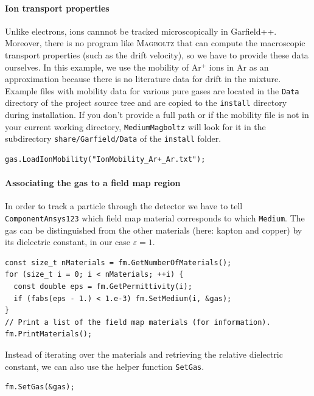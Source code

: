 \paragraph{Ion transport properties}
Unlike electrons, ions cannnot be tracked microscopically in Garfield++.
Moreover, there is no program like \textsc{Magboltz} that can compute  
the macroscopic transport properties (such as the drift velocity),
so we have to provide these data ourselves.
In this example, we use the mobility of Ar$^{+}$ ions in Ar
as an approximation because there is no literature data for drift in the
mixture.
Example files with mobility data for various pure gases are located
in the \texttt{Data} directory of the project source tree and are copied to the \texttt{install} directory during installation. 
If you don't provide a full path or if the mobility file is not in your current working directory, \texttt{MediumMagboltz} will look for it in the subdirectory \texttt{share/Garfield/Data} of the \texttt{install} folder.
\begin{lstlisting}
gas.LoadIonMobility("IonMobility_Ar+_Ar.txt");
\end{lstlisting}
\paragraph{Associating the gas to a field map region}
In order to track a particle through the detector we have to 
tell \texttt{ComponentAnsys123} which field map material corresponds 
to which \texttt{Medium}.
The gas can be distinguished from the other materials
(here: kapton and copper) by its dielectric constant, in our case
$\varepsilon = 1$.
\begin{lstlisting}
const size_t nMaterials = fm.GetNumberOfMaterials();
for (size_t i = 0; i < nMaterials; ++i) {
  const double eps = fm.GetPermittivity(i);
  if (fabs(eps - 1.) < 1.e-3) fm.SetMedium(i, &gas);
}
// Print a list of the field map materials (for information).
fm.PrintMaterials();
\end{lstlisting}
Instead of iterating over the materials and retrieving the relative 
dielectric constant, we can also use the helper function \texttt{SetGas}.
\begin{lstlisting}
fm.SetGas(&gas);
\end{lstlisting}

